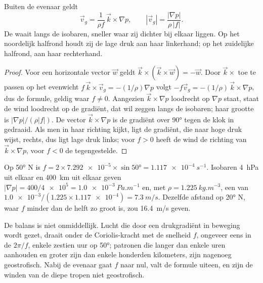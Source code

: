 \begin{theorem}\label{thm:b1:atmospheric-circulation:geostrophic}
Buiten de evenaar geldt
\[
  \vec v_g = \frac{1}{\rho f}\,\vec k\times\nabla p, \qquad
  |\vec v_g| = \frac{|\nabla p|}{\rho\,|f|} .
\]
De  waait langs de isobaren, sneller waar zij dichter bij elkaar liggen. Op het noordelijk halfrond houdt zij de lage druk aan haar linkerhand; op het zuidelijke
halfrond, aan haar rechterhand.
\end{theorem}

\begin{proof}
Voor een horizontale vector $\vec w$ geldt $\vec k\times(\vec k\times\vec w) = -\vec w$. Door $\vec k\times$ toe te passen op het evenwicht $f\,\vec k\times\vec v_g = -(1/\rho)\nabla p$ volgt $-f\vec v_g = -(1/\rho)\,\vec k\times\nabla p$, dus de formule, geldig waar
$f \neq 0$. Aangezien $\vec k\times\nabla p$ loodrecht op $\nabla p$ staat, staat de wind loodrecht op de gradiënt, dat wil zeggen langs de isobaren; haar grootte is $|\nabla
p|/(\rho|f|)$. De vector $\vec k\times\nabla p$ is de gradiënt over \ang{90} tegen de klok in gedraaid. Als men in haar richting kijkt, ligt de gradiënt, die naar hoge druk wijst, rechts, dus ligt lage druk links; voor $f > 0$ heeft de wind de richting van $\vec k\times\nabla p$, voor $f < 0$ de tegengestelde.
\end{proof}

\begin{example}\label{ex:b1:atmospheric-circulation:geostrophic}
Op \ang{50} N is $f = 2 \times \num{7.292e-5} \times \sin\ang{50} = \qty{1.117e-4}{s^{-1}}$.
Isobaren \qty{4}{hPa} uit elkaar en \qty{400}{km} uit elkaar geven $|\nabla p| = 400/\num{4e5} =
\qty{1.0e-3}{Pa.m^{-1}}$ en, met $\rho = \qty{1.225}{kg.m^{-3}}$, een  van $\num{1.0e-3}/(1.225 \times \num{1.117e-4}) = \qty{7.3}{m/s}$. Dezelfde
afstand op \ang{20} N, waar $f$ minder dan de helft zo groot is, zou
\qty{16.4}{m/s} geven.
\end{example}

De balans is niet onmiddellijk. Lucht die door een drukgradiënt in beweging wordt gezet, draait onder de Coriolis-kracht met de snelheid $f$, ongeveer eens in de $2\pi/f$, enkele zestien uur op \ang{50}; patronen die langer dan enkele uren aanhouden en groter zijn dan enkele honderden kilometers, zijn nagenoeg geostrofisch. Nabij de evenaar gaat $f$ naar nul, valt de formule uiteen, en zijn de winden van de diepe tropen niet geostrofisch.

